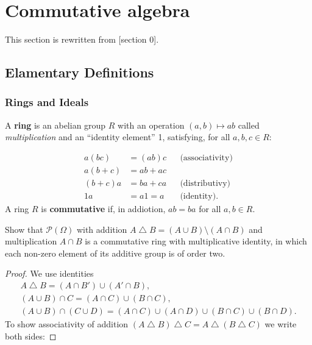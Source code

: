 \chapter{Commutative algebra}
\setcounter{section}{-1}

This section is rewritten from \cite{eisenbud-2004}[section 0].

\section{Elamentary Definitions}
\subsection{Rings and Ideals}
A \textbf{ring} is an abelian group $R$ with an operation $(a, b)
\mapsto ab$ called \emph{multiplication} and an ``identity element''
1, satisfying, for all $a, b, c \in R$:

\begin{align*}
  a(bc) &= (ab)c && \text{(associativity)} \\
  a(b + c) &= ab + ac \\
  (b + c) a &= ba + ca && \text{(distributivy)} \\
  1a &= a1 = a && \text{(identity)}.
\end{align*}
A ring $R$ is \textbf{commutative} if, in addiotion, $ab = ba$ for all
$a, b \in R$.

\begin{exercise}
Show that $\mathcal{P}(\Omega)$ with addition $A \mathbin{\triangle} B
= (A \cup B) \setminus (A \cap B)$ and multiplication $A \cap B$ is a
commutative ring with multiplicative identity, in which each non-zero
element of its additive group is of order two.
\end{exercise}
\begin{proof}
  We use identities
  \begin{gather*}
    A \mathbin{\triangle} B = (A \cap B') \cup (A' \cap B), \\
    (A \cup B) \cap C = (A \cap C) \cup (B \cap C), \\
    (A \cup B) \cap (C \cup D) = (A \cap C) \cup (A \cap D) \cup (B
    \cap C) \cup (B \cap D).
  \end{gather*}
  To show associativity of addition $(A \mathbin{\triangle} B)
  \mathbin{\triangle} C = A \mathbin{\triangle} (B \mathbin{\triangle}
  C)$ we write both sides:
\end{proof}
